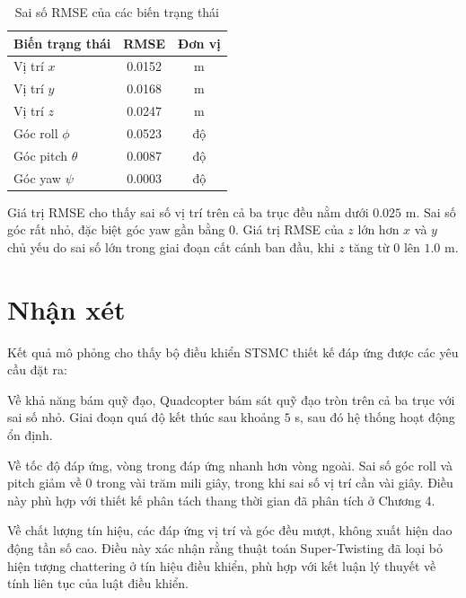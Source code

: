 \documentclass[12pt,a4paper]{report}
\begin{document}
\begin{table}[h!]
\centering
\caption{Sai số RMSE của các biến trạng thái}
\label{tab:rmse}
\renewcommand{\arraystretch}{1.3}
\begin{tabular}{|l|c|c|}
\hline
Biến trạng thái & RMSE & Đơn vị \\
\hline
Vị trí $x$ & 0.0152 & m \\
Vị trí $y$ & 0.0168 & m \\
Vị trí $z$ & 0.0247 & m \\
Góc roll $\phi$ & 0.0523 & độ \\
Góc pitch $\theta$ & 0.0087 & độ \\
Góc yaw $\psi$ & 0.0003 & độ \\
\hline
\end{tabular}
\end{table}

Giá trị RMSE cho thấy sai số vị trí trên cả ba trục đều nằm dưới $0.025$ m. Sai số góc rất nhỏ, đặc biệt góc yaw gần bằng $0$. Giá trị RMSE của $z$ lớn hơn $x$ và $y$ chủ yếu do sai số lớn trong giai đoạn cất cánh ban đầu, khi $z$ tăng từ $0$ lên $1.0$ m.

\section{Nhận xét}
Kết quả mô phỏng cho thấy bộ điều khiển STSMC thiết kế đáp ứng được các yêu cầu đặt ra:

Về khả năng bám quỹ đạo, Quadcopter bám sát quỹ đạo tròn trên cả ba trục với sai số nhỏ. Giai đoạn quá độ kết thúc sau khoảng $5$ s, sau đó hệ thống hoạt động ổn định.

Về tốc độ đáp ứng, vòng trong đáp ứng nhanh hơn vòng ngoài. Sai số góc roll và pitch giảm về $0$ trong vài trăm mili giây, trong khi sai số vị trí cần vài giây. Điều này phù hợp với thiết kế phân tách thang thời gian đã phân tích ở Chương 4.

Về chất lượng tín hiệu, các đáp ứng vị trí và góc đều mượt, không xuất hiện dao động tần số cao. Điều này xác nhận rằng thuật toán Super-Twisting đã loại bỏ hiện tượng chattering ở tín hiệu điều khiển, phù hợp với kết luận lý thuyết về tính liên tục của luật điều khiển.
\end{document}
